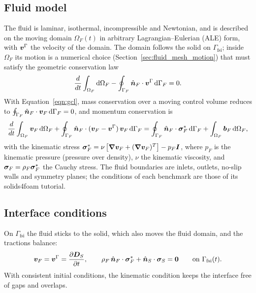 \subsection{Fluid model}
\label{sec:fluid_governing_eqn}

The fluid is laminar, isothermal, incompressible and Newtonian, and is described on the moving domain $\Omega_F(t)$ in arbitrary Lagrangian--Eulerian (ALE) form, with $\boldsymbol{v}^\Gamma$ the velocity of the domain.
The domain follows the solid on $\Gamma_\text{fsi}$; inside $\Omega_F$ its motion is a numerical choice (Section~\ref{sec:fluid_mesh_motion}) that must satisfy the geometric conservation law
\begin{equation}
    \frac{d}{dt} \int_{\Omega_F} \text{d}\Omega_F - \oint_{\Gamma_F} \hat{\boldsymbol{n}}_F \cdot \boldsymbol{v}^\Gamma \, \text{d}\Gamma_F = 0 .
    \label{eqn:gcl}
\end{equation}
With Equation~\eqref{eqn:gcl}, mass conservation over a moving control volume reduces to $\oint_{\Gamma_F} \hat{\boldsymbol{n}}_F \cdot \boldsymbol{v}_F \, \text{d}\Gamma_F = 0$, and momentum conservation is
\begin{equation}
    \frac{d}{dt} \int_{\Omega_F} \boldsymbol{v}_F \, \text{d}\Omega_F
    + \oint_{\Gamma_F} \hat{\boldsymbol{n}}_F \cdot (\boldsymbol{v}_F - \boldsymbol{v}^\Gamma)\, \boldsymbol{v}_F \, \text{d}\Gamma_F
    = \oint_{\Gamma_F} \hat{\boldsymbol{n}}_F \cdot \boldsymbol{\sigma}_F^* \, \text{d}\Gamma_F
    + \int_{\Omega_F} \boldsymbol{b}_F \, \text{d}\Omega_F,
    \label{eqn:fluid_momentum_ale}
\end{equation}
with the kinematic stress $\boldsymbol{\sigma}_F^* = \nu\left[\boldsymbol{\nabla}\boldsymbol{v}_F + (\boldsymbol{\nabla}\boldsymbol{v}_F)^T\right] - p_F \boldsymbol{I}$, where $p_F$ is the kinematic pressure (pressure over density), $\nu$ the kinematic viscosity, and $\boldsymbol{\sigma}_F = \rho_F \boldsymbol{\sigma}_F^*$ the Cauchy stress.
The fluid boundaries are inlets, outlets, no-slip walls and symmetry planes; the conditions of each benchmark are those of its solids4foam tutorial.

\subsection{Interface conditions}
\label{sec:fsi_interface}

On $\Gamma_\text{fsi}$ the fluid sticks to the solid, which also moves the fluid domain, and the tractions balance:
\begin{equation}
    \boldsymbol{v}_F = \boldsymbol{v}^\Gamma = \frac{\partial \boldsymbol{D}_S}{\partial t},
    \qquad
    \rho_F \, \hat{\boldsymbol{n}}_F \cdot \boldsymbol{\sigma}_F^* + \hat{\boldsymbol{n}}_S \cdot \boldsymbol{\sigma}_S = \boldsymbol{0}
    \qquad \text{on } \Gamma_\text{fsi}(t).
    \label{eqn:kinematic_interface}
\end{equation}
With consistent initial conditions, the kinematic condition keeps the interface free of gaps and overlaps.

